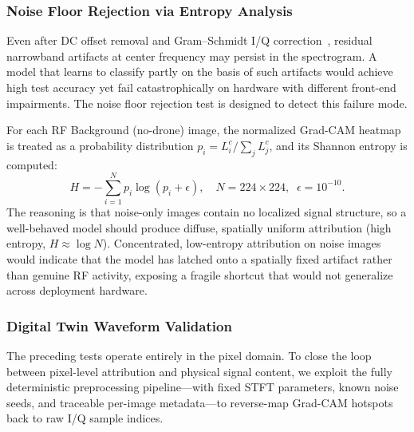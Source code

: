 \documentclass[runningheads]{llncs}
\begin{document}
\subsubsection{Noise Floor Rejection via Entropy Analysis}

Even after DC offset removal and Gram--Schmidt I/Q correction~\cite{ref34}, residual narrowband artifacts at center frequency may persist in the spectrogram. A model that learns to classify partly on the basis of such artifacts would achieve high test accuracy yet fail catastrophically on hardware with different front-end impairments. The noise floor rejection test is designed to detect this failure mode.

For each RF Background (no-drone) image, the normalized Grad-CAM heatmap is treated as a probability distribution $p_i = L^c_i / \sum_j L^c_j$, and its Shannon entropy is computed:
\begin{equation}
  H = -\sum_{i=1}^{N} p_i \log(p_i + \epsilon),
  \quad N = 224 \times 224,\;\; \epsilon = 10^{-10}.
\end{equation}
The reasoning is that noise-only images contain no localized signal structure, so a well-behaved model should produce diffuse, spatially uniform attribution (high entropy, $H \approx \log N$). Concentrated, low-entropy attribution on noise images would indicate that the model has latched onto a spatially fixed artifact rather than genuine RF activity, exposing a fragile shortcut that would not generalize across deployment hardware.

\subsubsection{Digital Twin Waveform Validation}

The preceding tests operate entirely in the pixel domain. To close the loop between pixel-level attribution and physical signal content, we exploit the fully deterministic preprocessing pipeline---with fixed STFT parameters, known noise seeds, and traceable per-image metadata---to reverse-map Grad-CAM hotspots back to raw I/Q sample indices.
\end{document}
